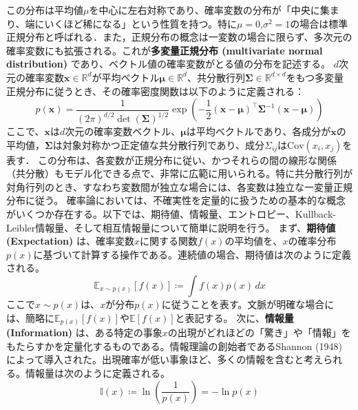 この分布は平均値$\mu$を中心に左右対称であり、確率変数の分布が「中央に集まり、端にいくほど稀になる」という性質を持つ。特に$\mu = 0$,$\sigma^2 = 1$の場合は標準正規分布と呼ばれる．また，正規分布の概念は一変数の場合に限らず、多次元の確率変数にも拡張される。これが\textbf{多変量正規分布 (multivariate normal distribution)} であり、ベクトル値の確率変数がとる値の分布を記述する。
$d$次元の確率変数$\mathbf{x} \in \mathbb{R}^d$が平均ベクトル$\boldsymbol{\mu} \in \mathbb{R}^d$、共分散行列$\boldsymbol{\Sigma} \in \mathbb{R}^{d \times d}$をもつ多変量正規分布に従うとき、その確率密度関数は以下のように定義される：
\begin{equation}
p(\mathbf{x}) = \frac{1}{(2\pi)^{d/2} \det(\boldsymbol{\Sigma})^{1/2}} \exp\left( -\frac{1}{2} (\mathbf{x} - \boldsymbol{\mu})^\top \boldsymbol{\Sigma}^{-1} (\mathbf{x} - \boldsymbol{\mu}) \right)
\end{equation}
ここで、$\mathbf{x}$は$d$次元の確率変数ベクトル、$\boldsymbol{\mu}$は平均ベクトルであり、各成分が$\mathbf{x}$の平均値，$\boldsymbol{\Sigma}$は対象対称かつ正定値な共分散行列であり、成分$\Sigma_{ij}$は$\mathrm{Cov}(x_i, x_j)$を表す．
この分布は、各変数が正規分布に従い、かつそれらの間の線形な関係（共分散）もモデル化できる点で、非常に広範に用いられる。特に共分散行列が対角行列のとき、すなわち変数間が独立な場合には、各変数は独立な一変量正規分布に従う。
確率論においては、不確実性を定量的に扱うための基本的な概念がいくつか存在する。以下では、期待値、情報量、エントロピー、Kullback-Leibler情報量、そして相互情報量について簡単に説明を行う。
まず、\textbf{期待値 (Expectation)} は、確率変数$x$に関する関数$f(x)$の平均値を、$x$の確率分布$p(x)$に基づいて計算する操作である。連続値の場合、期待値は次のように定義される。
\begin{equation}
\mathbb{E}_{x\sim p(x)}\left[f(x)\right] \coloneqq \int f(x)p(x)\,dx
\end{equation}
ここで$x \sim p(x)$は、$x$が分布$p(x)$に従うことを表す。文脈が明確な場合には、簡略に$\mathbb{E}_{p(x)}[f(x)]$や$\mathbb{E}[f(x)]$と表記する。
次に、\textbf{情報量 (Information)} は、ある特定の事象$x$の出現がどれほどの「驚き」や「情報」をもたらすかを定量化するものである。情報理論の創始者であるShannon (1948) によって導入された。出現確率が低い事象ほど、多くの情報を含むと考えられる。情報量は次のように定義される。
\begin{equation}
\mathbb{I}(x) \coloneqq \ln\left(\frac{1}{p(x)}\right) = -\ln p(x)
\end{equation}
